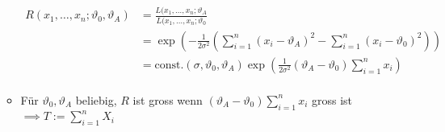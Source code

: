 \begin{itemize}
\begin{itemize}
                \begin{align*}
                    R(x_1, \dots, x_n; \vartheta_0, \vartheta_A) &= \frac{L(x_1, \dots, x_n; \vartheta_A}{L(x_1, \dots, x_n; \vartheta_0}\\
                                                                 &= \exp \left( -\frac{1}{2 \sigma^2} \left( \sum_{i=1}^n (x_i - \vartheta_A)^2 - \sum_{i=1}^n (x_i - \vartheta_0)^2 \right) \right)\\
                                                                 &= \text{const.}(\sigma, \vartheta_0, \vartheta_A) \exp \left( \frac{1}{2 \sigma^2} (\vartheta_A - \vartheta_0) \sum_{i=1}^n x_i \right)\\
                \end{align*}
            \item Für $\vartheta_0, \vartheta_A$ beliebig, $R$ ist gross wenn $(\vartheta_A - \vartheta_0) \sum_{i=1}^n x_i$ gross ist $\implies T := \sum_{i=1}^n X_i$
        \end{itemize}
\end{itemize}
